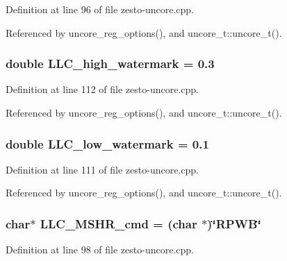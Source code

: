 Definition at line 96 of file zesto-uncore.cpp.

Referenced by uncore\_\-reg\_\-options(), and uncore\_\-t::uncore\_\-t().
\subsubsection[{LLC\_\-high\_\-watermark}]{\setlength{\rightskip}{0pt plus 5cm}double {\bf LLC\_\-high\_\-watermark} = 0.3\hspace{0.3cm}{\tt  [static]}}\label{zesto-uncore_8cpp_25603ec42346b788ee4c32c248b1118a}




Definition at line 112 of file zesto-uncore.cpp.

Referenced by uncore\_\-reg\_\-options(), and uncore\_\-t::uncore\_\-t().
\subsubsection[{LLC\_\-low\_\-watermark}]{\setlength{\rightskip}{0pt plus 5cm}double {\bf LLC\_\-low\_\-watermark} = 0.1\hspace{0.3cm}{\tt  [static]}}\label{zesto-uncore_8cpp_21836c73e56781bb1ebc088cc2c99f1a}




Definition at line 111 of file zesto-uncore.cpp.

Referenced by uncore\_\-reg\_\-options(), and uncore\_\-t::uncore\_\-t().
\subsubsection[{LLC\_\-MSHR\_\-cmd}]{\setlength{\rightskip}{0pt plus 5cm}char$\ast$ {\bf LLC\_\-MSHR\_\-cmd} = (char $\ast$)\char`\"{}RPWB\char`\"{}\hspace{0.3cm}{\tt  [static]}}\label{zesto-uncore_8cpp_fa5d0eeccfac4a1248ca4b3666cc7768}




Definition at line 98 of file zesto-uncore.cpp.


